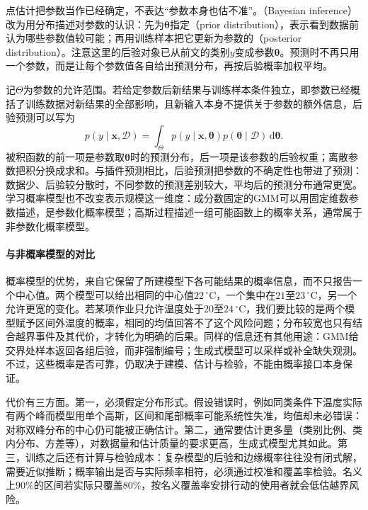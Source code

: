点估计把参数当作已经确定，不表达“参数本身也估不准”。（Bayesian inference）改为用分布描述对参数的认识：先为$\bm{\theta}$指定（prior distribution），表示看到数据前认为哪些参数值较可能；再用训练样本把它更新为参数的（posterior distribution）。注意这里的后验对象已从前文的类别$y$变成参数$\bm{\theta}$。预测时不再只用一个参数，而是让每个参数值各自给出预测分布，再按后验概率加权平均。

记$\Theta$为参数的允许范围。若给定参数后新结果与训练样本条件独立，即参数已经概括了训练数据对新结果的全部影响，且新输入本身不提供关于参数的额外信息，后验预测可以写为
\[
  p(y\mid\bm{x},\mathcal{D})
  =\int_{\Theta} p(y\mid\bm{x},\bm{\theta})
    p(\bm{\theta}\mid\mathcal{D})\,\mathrm d\bm{\theta}.
\]
被积函数的前一项是参数取$\bm{\theta}$时的预测分布，后一项是该参数的后验权重；离散参数把积分换成求和。与插件预测相比，后验预测把参数的不确定性也带进了预测：数据少、后验较分散时，不同参数的预测差别较大，平均后的预测分布通常更宽。学习概率模型也不改变表示规模这一维度：成分数固定的GMM可以用固定维数参数描述，是参数化概率模型；高斯过程描述一组可能函数上的概率关系，通常属于非参数化概率模型。

\paragraph{与非概率模型的对比}

概率模型的优势，来自它保留了所建模型下各可能结果的概率信息，而不只报告一个中心值。两个模型可以给出相同的中心值$22\,^{\circ}\mathrm{C}$，一个集中在$21$至$23\,^{\circ}\mathrm{C}$，另一个允许更宽的变化。若某项作业只允许温度处于$20$至$24\,^{\circ}\mathrm{C}$，我们要比较的是两个模型赋予区间外温度的概率，相同的均值回答不了这个风险问题；分布较宽也只有结合越界事件及其代价，才转化为明确的后果。同样的信息还有其他用途：GMM给交界处样本返回各组后验，而非强制编号；生成式模型可以采样或补全缺失观测。不过，这些概率是否可靠，仍取决于建模、估计与检验，不能由概率接口本身保证。

代价有三方面。第一，必须假定分布形式。假设错误时，例如同类条件下温度实际有两个峰而模型用单个高斯，区间和尾部概率可能系统性失准，均值却未必错误：对称双峰分布的中心仍可能被正确估计。第二，通常要估计更多量（类别比例、类内分布、方差等），对数据量和估计质量的要求更高，生成式模型尤其如此。第三，训练之后还有计算与检验成本：复杂模型的后验和边缘概率往往没有闭式解，需要近似推断；概率输出是否与实际频率相符，必须通过校准和覆盖率检验。名义上$90\%$的区间若实际只覆盖$80\%$，按名义覆盖率安排行动的使用者就会低估越界风险。

